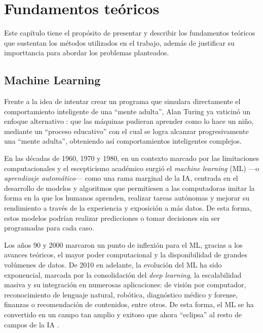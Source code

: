 \chapter{Fundamentos teóricos}

Este capítulo tiene el propósito de presentar y describir los fundamentos teóricos que sustentan los métodos 
utilizados en el trabajo, además de justificar su importtancia para abordar los problemas planteados.


\section{Machine Learning}

Frente a la idea de intentar crear un programa que simulara directamente el comportamiento inteligente de una 
``mente adulta'', Alan Turing ya vaticinó un enfoque alternativo \cite{turing1950}: que las máquinas pudieran 
aprender como lo hace un niño, mediante un ``proceso educativo'' con el cual se logra alcanzar progresivamente 
una ``mente adulta'', obteniendo así comportamientos inteligentes complejos.


En las décadas de 1960, 1970 y 1980, en un contexto marcado por las limitaciones computacionales y el 
escepticismo académico surgió el \textit{machine learning} (ML) ---o \textit{aprendizaje automático}--- como 
una rama marginal de la IA, centrada en el desarrollo de modelos y algoritmos que permitiesen a las 
computadoras imitar la forma en la que los humanos aprenden, realizar tareas autónomas y mejorar su 
rendimiento a través de la experiencia y exposición a más datos. De esta forma, estos modelos podrían realizar 
predicciones o tomar decisiones sin ser programadas para cada caso.

Los años 90 y 2000 marcaron un punto de inflexión para el ML, gracias a los avances teóricos, el mayor poder 
computacional y la disponibilidad de grandes volúmenes de datos. De 2010 en adelante, la evolución del ML ha 
sido exponencial, marcada por la consolidación del \textit{deep learning}, la escalabilidad masiva y su 
integración en numerosas aplicaciones: de visión por computador, reconocimiento de lenguaje natural, robótica, 
diagnóstico médico y forense, finanzas o recomendación de contenidos, entre otros. De esta forma, el ML se ha 
convertido en un campo tan amplio y exitoso que ahora ``eclipsa'' al resto de campos de la IA 
\cite{domingos2015}.

